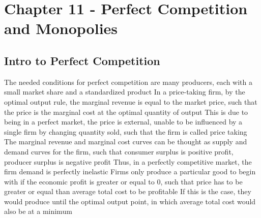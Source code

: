 \documentclass[11 pt, twoside]{article}
\newenvironment{outline*}
{
	\begin{outline}[enumerate]
	}
	{\end{outline}
}
\begin{document}
\section{Chapter 11 - Perfect Competition and Monopolies}
\subsection{Intro to Perfect Competition}
\begin{outline*}
\1 The needed conditions for perfect competition are many producers, each with a small market share and a standardized product
\1 In a price-taking firm, by the optimal output rule, the marginal revenue is equal to the market price, such that the price is the marginal cost at the optimal quantity of output
\2 This is due to being in a perfect market, the price is external, unable to be influenced by a single firm by changing quantity sold, such that the firm is called price taking
\1 The marginal revenue and marginal cost curves can be thought as supply and demand curves for the firm, such that consumer surplus is positive profit, producer surplus is negative profit
\2 Thus, in a perfectly competitive market, the firm demand is perfectly inelastic
\1 Firms only produce a particular good to begin with if the economic profit is greater or equal to 0, such that price has to be greater or equal than average total cost to be profitable
\2 If this is the case, they would produce until the optimal output point, in which average total cost would also be at a minimum
\end{outline*}
\end{document}
